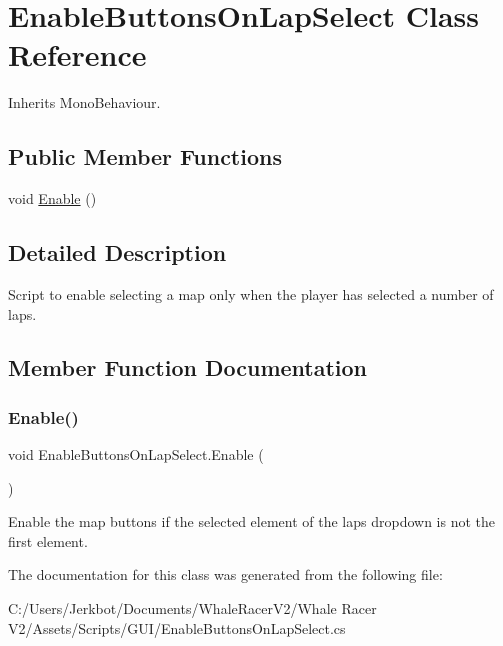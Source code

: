 \hypertarget{class_enable_buttons_on_lap_select}{}\section{Enable\+Buttons\+On\+Lap\+Select Class Reference}
\label{class_enable_buttons_on_lap_select}


Inherits Mono\+Behaviour.

\subsection*{Public Member Functions}
\begin{DoxyCompactItemize}
\item 
void \hyperlink{class_enable_buttons_on_lap_select_a6151b65b8dd00f5e45491d22a720dac2}{Enable} ()
\end{DoxyCompactItemize}


\subsection{Detailed Description}
Script to enable selecting a map only when the player has selected a number of laps. 



\subsection{Member Function Documentation}
\mbox{\label{class_enable_buttons_on_lap_select_a6151b65b8dd00f5e45491d22a720dac2}} 
\subsubsection{\texorpdfstring{Enable()}{Enable()}}
{\footnotesize\ttfamily void Enable\+Buttons\+On\+Lap\+Select.\+Enable (\begin{DoxyParamCaption}{ }\end{DoxyParamCaption})}



Enable the map buttons if the selected element of the laps dropdown is not the first element. 



The documentation for this class was generated from the following file\+:\begin{DoxyCompactItemize}
\item 
C\+:/\+Users/\+Jerkbot/\+Documents/\+Whale\+Racer\+V2/\+Whale Racer V2/\+Assets/\+Scripts/\+G\+U\+I/Enable\+Buttons\+On\+Lap\+Select.\+cs\end{DoxyCompactItemize}
